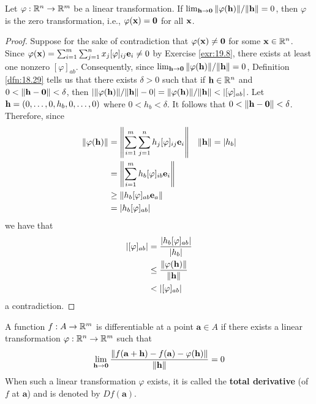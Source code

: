 \documentclass[../main.tex]{subfiles}
\begin{document}
\begin{lemma}\label{lem:19.13}
    Let $\varphi:\mathbb{R}^n\to\mathbb{R}^m$ be a linear transformation. If $\lim_{\mathbf{h}\to\mathbf{0}}\norm{\varphi(\mathbf{h})}/\norm{\mathbf{h}}=0$, then $\varphi$ is the zero transformation, i.e., $\varphi(\mathbf{x})=\mathbf{0}$ for all $\mathbf{x}$.
    \begin{proof}
        Suppose for the sake of contradiction that $\varphi(\mathbf{x})\neq\mathbf{0}$ for some $\mathbf{x}\in\mathbb{R}^n$. Since $\varphi(\mathbf{x})=\sum_{i=1}^m\sum_{j=1}^nx_j[\varphi]_{ij}\mathbf{e}_i\neq 0$ by Exercise \ref{exr:19.8}, there exists at least one nonzero $[\varphi]_{ab}$. Consequently, since $\lim_{\mathbf{h}\to\mathbf{0}}\norm{\varphi(\mathbf{h})}/\norm{\mathbf{h}}=0$, Definition \ref{dfn:18.29} tells us that there exists $\delta>0$ such that if $\mathbf{h}\in\mathbb{R}^n$ and $0<\norm{\mathbf{h}-\mathbf{0}}<\delta$, then $|\norm{\varphi(\h)}/\norm{\h}-0|=\norm{\varphi(\h)}/\norm{\h}<|[\varphi]_{ab}|$. Let $\mathbf{h}=(0,\dots,0,h_b,0,\dots,0)$ where $0<h_b<\delta$. It follows that $0<\norm{\mathbf{h}-\mathbf{0}}<\delta$. Therefore, since
        \begin{align*}
            \norm{\varphi(\mathbf{h})} &= \norm{\sum_{i=1}^m\sum_{j=1}^nh_j[\varphi]_{ij}\mathbf{e}_i}&
                \norm{\mathbf{h}} &= |h_b|\\
            &= \norm{\sum_{i=1}^mh_b[\varphi]_{ib}\mathbf{e}_i}\\
            &\geq \norm{h_b[\varphi]_{ab}\mathbf{e}_a}\\
            &= |h_b[\varphi]_{ab}|
        \end{align*}
        we have that
        \begin{align*}
            |[\varphi]_{ab}| &= \frac{|h_b[\varphi]_{ab}|}{|h_b|}\\
            &\leq \frac{\norm{\varphi(\mathbf{h})}}{\norm{\mathbf{h}}}\\
            &< |[\varphi]_{ab}|
        \end{align*}
        a contradiction.
    \end{proof}
\end{lemma}

\begin{definition}\label{dfn:19.14}
    A function $f:A\to\mathbb{R}^m$ is differentiable at a point $\mathbf{a}\in A$ if there exists a linear transformation $\varphi:\mathbb{R}^n\to\mathbb{R}^m$ such that
    \begin{equation*}
        \lim_{\mathbf{h}\to\mathbf{0}}\frac{\norm{f(\mathbf{a}+\mathbf{h})-f(\mathbf{a})-\varphi(\mathbf{h})}}{\norm{\mathbf{h}}}=0
    \end{equation*}
    When such a linear transformation $\varphi$ exists, it is called the \textbf{total derivative} (of $f$ at $\mathbf{a}$) and is denoted by $Df(\mathbf{a})$.
\end{definition}
\end{document}
